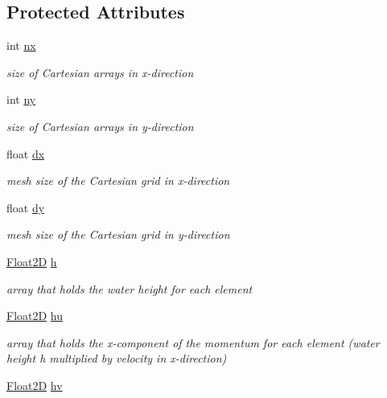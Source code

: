 \subsection*{Protected Attributes}
\begin{DoxyCompactItemize}
\item 
int \hyperlink{classSWE__Block_a46ec0dc1157997bd255fb39924f1e2bb}{nx}
\begin{DoxyCompactList}\small\item\em size of Cartesian arrays in x-\/direction \end{DoxyCompactList}\item 
int \hyperlink{classSWE__Block_a3f139630d12423eb4bd7df3e45c7f5da}{ny}
\begin{DoxyCompactList}\small\item\em size of Cartesian arrays in y-\/direction \end{DoxyCompactList}\item 
float \hyperlink{classSWE__Block_af2262b1cce6834d939c5a2315dae49b1}{dx}
\begin{DoxyCompactList}\small\item\em mesh size of the Cartesian grid in x-\/direction \end{DoxyCompactList}\item 
float \hyperlink{classSWE__Block_a9feb988748d792bca0ca0508e43bd87f}{dy}
\begin{DoxyCompactList}\small\item\em mesh size of the Cartesian grid in y-\/direction \end{DoxyCompactList}\item 
\hyperlink{classFloat2D}{Float2D} \hyperlink{classSWE__Block_a64a0f8f437f38b5f3b8ec5b4abdb864e}{h}
\begin{DoxyCompactList}\small\item\em array that holds the water height for each element \end{DoxyCompactList}\item 
\hyperlink{classFloat2D}{Float2D} \hyperlink{classSWE__Block_aec2c1278fdb23f083216d8d397f26060}{hu}
\begin{DoxyCompactList}\small\item\em array that holds the x-\/component of the momentum for each element (water height h multiplied by velocity in x-\/direction) \end{DoxyCompactList}\item 
\hyperlink{classFloat2D}{Float2D} \hyperlink{classSWE__Block_a0897aa3c2d78749f209c95e08196d831}{hv}

\end{DoxyCompactItemize}
